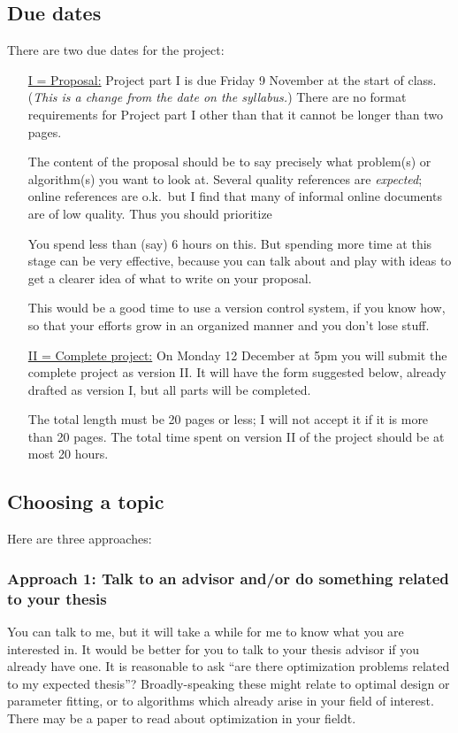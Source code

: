 \documentclass[12pt]{amsart}
\begin{document}
\subsection*{Due dates} There are two due dates for the project:

\medskip
\begin{itemize}
\item[\underline{I = Proposal:}]  Project part I is due Friday 9 November at the start of class.  (\emph{This is a change from the date on the syllabus.})  There are no format requirements for Project part I other than that it cannot be longer than two pages.

The content of the proposal should be to say precisely what problem(s) or algorithm(s) you want to look at.  Several quality references are \emph{expected}; online references are o.k.~but I find that many of informal online documents are of low quality.  Thus you should prioritize 

You spend less than (say) 6 hours on this.  But spending more time at this stage can be very effective, because you can talk about and play with ideas to get a clearer idea of what to write on your proposal.

This would be a good time to use a version control system, if you know how, so that your efforts grow in an organized manner and you don't lose stuff.

\medskip
\item[\underline{II = Complete project:}]  On Monday 12 December at 5pm you will submit the complete project as version II.  It will have the form suggested below, already drafted as version I, but all parts will be completed.

The total length must be 20 pages or less; I will not accept it if it is more than 20 pages.  The total time spent on version II of the project should be at most 20 hours.
\end{itemize}


\newpage
\subsection*{Choosing a topic}  Here are three approaches:

\subsubsection*{Approach 1: Talk to an advisor and/or do something related to your thesis}  You can talk to me, but it will take a while for me to know what you are interested in.  It would be better for you to talk to your thesis advisor if you already have one.  It is reasonable to ask ``are there optimization problems related to my expected thesis''?  Broadly-speaking these might relate to optimal design or parameter fitting, or to algorithms which already arise in your field of interest.  There may be a paper to read about optimization in your fieldt.
\end{document}
